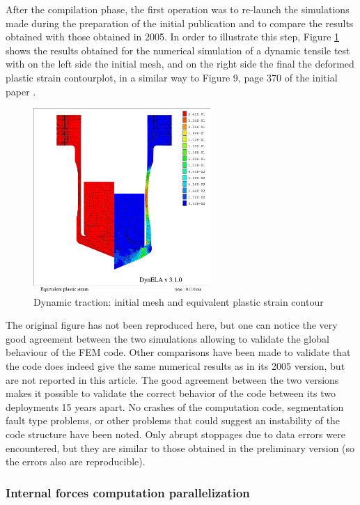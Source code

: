 After the compilation phase, the first operation was to re-launch the simulations made during the preparation of the initial publication and to compare the results obtained with those obtained in 2005. In order to illustrate this step, Figure \ref{strain} shows the results obtained for the numerical simulation of a dynamic tensile test with on the left side the initial mesh, and on the right side the final the deformed plastic strain contourplot, in a similar way to Figure 9, page 370 of the initial paper \cite{Pantale:2005}. 
\begin{figure}[h!] 
  \centering
  \includegraphics[width=0.6\textwidth]{./strain.pdf}
  \caption{Dynamic traction: initial mesh and equivalent plastic strain contour}
  \label{strain}
\end{figure}
The original figure has not been reproduced here, but one can notice the very good agreement between the two simulations allowing to validate the global behaviour of the FEM code. Other comparisons have been made to validate that the code does indeed give the same numerical results as in its 2005 version, but are not reported in this article. The good agreement between the two versions makes it possible to validate the correct behavior of the code between its two deployments 15 years apart. No crashes of the computation code, segmentation fault type problems, or other problems that could suggest an instability of the code structure have been noted. Only abrupt stoppages due to data errors were encountered, but they are similar to those obtained in the preliminary version (so the errors also are reproducible).

\subsubsection{Internal forces computation parallelization}

